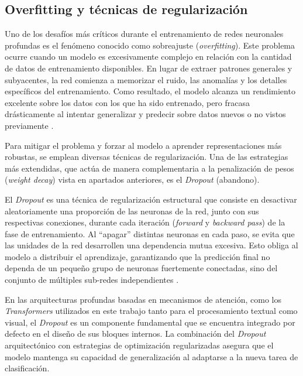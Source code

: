 \subsection{Overfitting y técnicas de regularización}
\label{subsec:Overfitting}
Uno de los desafíos más críticos durante el entrenamiento de redes neuronales profundas es el fenómeno conocido como sobreajuste (\textit{overfitting}). Este problema ocurre cuando un modelo es excesivamente complejo en relación con la cantidad de datos de entrenamiento disponibles. En lugar de extraer patrones generales y subyacentes, la red comienza a memorizar el ruido, las anomalías y los detalles específicos del entrenamiento. Como resultado, el modelo alcanza un rendimiento excelente sobre los datos con los que ha sido entrenado, pero fracasa drásticamente al intentar generalizar y predecir sobre datos nuevos o no vistos previamente \cite{ying2019overview}.

Para mitigar el problema y forzar al modelo a aprender representaciones más robustas, se emplean diversas técnicas de regularización. Una de las estrategias más extendidas, que actúa de manera complementaria a la penalización de pesos (\textit{weight decay}) vista en apartados anteriores, es el \textit{Dropout} (abandono). 

El \textit{Dropout} es una técnica de regularización estructural que consiste en desactivar aleatoriamente una proporción de las neuronas de la red, junto con sus respectivas conexiones, durante cada iteración (\textit{forward} y \textit{backward pass}) de la fase de entrenamiento. Al ``apagar'' distintas neuronas en cada paso, se evita que las unidades de la red desarrollen una dependencia mutua excesiva. Esto obliga al modelo a distribuir el aprendizaje, garantizando que la predicción final no dependa de un pequeño grupo de neuronas fuertemente conectadas, sino del conjunto de múltiples sub-redes independientes \cite{srivastava2014dropout}.

En las arquitecturas profundas basadas en mecanismos de atención, como los \textit{Transformers} utilizados en este trabajo tanto para el procesamiento textual como visual, el \textit{Dropout} es un componente fundamental que se encuentra integrado por defecto en el diseño de sus bloques internos. La combinación del \textit{Dropout} arquitectónico con estrategias de optimización regularizadas asegura que el modelo mantenga su capacidad de generalización al adaptarse a la nueva tarea de clasificación.  

